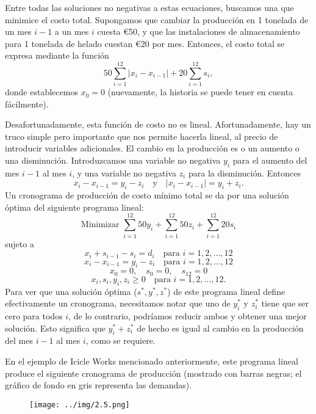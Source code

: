 \documentclass{article}
\begin{document}
Entre todas las soluciones no negativas a estas ecuaciones, buscamos una que minimice el costo total. Supongamos que cambiar la producción en 1 tonelada de un mes \(i-1\) a un mes \(i\) cuesta €50, y que las instalaciones de almacenamiento para 1 tonelada de helado cuestan €20 por mes. Entonces, el costo total se expresa mediante la función
\[
50 \sum_{i=1}^{12} |x_i - x_{i-1}| + 20 \sum_{i=1}^{12} s_i,
\]
donde establecemos \(x_0 = 0\) (nuevamente, la historia se puede tener en cuenta fácilmente).

Desafortunadamente, esta función de costo no es lineal. Afortunadamente, hay un truco simple pero importante que nos permite hacerla lineal, al precio de introducir variables adicionales.
El cambio en la producción es o un aumento o una disminución. Introduzcamos una variable no negativa \(y_i\) para el aumento del mes \(i-1\) al mes \(i\), y una variable no negativa \(z_i\) para la disminución. Entonces
\[
x_i - x_{i-1} = y_i - z_i \quad \text{y} \quad |x_i - x_{i-1}| = y_i + z_i.
\]
Un cronograma de producción de costo mínimo total se da por una solución óptima del siguiente programa lineal:
\[
\text{Minimizar } \sum_{i=1}^{12} 50y_i + \sum_{i=1}^{12} 50z_i + \sum_{i=1}^{12} 20s_i
\]
sujeto a
\[
x_i + s_{i-1} - s_i = d_i \quad \text{para } i = 1, 2, \dots, 12
\]
\[
x_i - x_{i-1} = y_i - z_i \quad \text{para } i = 1, 2, \dots, 12
\]
\[
x_0 = 0, \quad s_0 = 0, \quad s_{12} = 0
\]
\[
x_i, s_i, y_i, z_i \geq 0 \quad \text{para } i = 1, 2, \dots, 12.
\]
Para ver que una solución óptima (\(s^*, y^*, z^*\)) de este programa lineal define efectivamente un cronograma, necesitamos notar que uno de \(y^*_i\) y \(z^*_i\) tiene que ser cero para todos \(i\), de lo contrario, podríamos reducir ambos y obtener una mejor solución. Esto significa que \(y^*_i + z^*_i\) de hecho es igual al cambio en la producción del mes \(i-1\) al mes \(i\), como se requiere.

En el ejemplo de Icicle Works mencionado anteriormente, este programa lineal produce el siguiente cronograma de producción (mostrado con barras negras; el gráfico de fondo en gris representa las demandas).

\begin{figure}[H] %
\centering %
\texttt{[image: ../img/2.5.png]} %
\label{fig:imagen} %
\end{figure}
\end{document}
